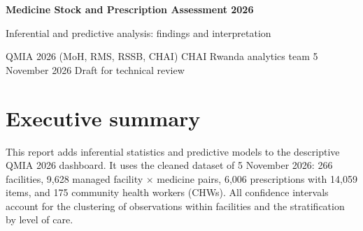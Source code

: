 \documentclass[10pt,a4paper]{article}
\begin{document}
\begin{titlepage}\vspace*{3cm}
{\Huge\bfseries\color{navy} Medicine Stock and Prescription Assessment 2026\par}\vspace{8pt}
{\Large\color{navy} Inferential and predictive analysis: findings and interpretation\par}\vspace{14pt}
{\small\color{gray} QMIA 2026 (MoH, RMS, RSSB, CHAI) \textperiodcentered{} CHAI Rwanda analytics team \textperiodcentered{} 5 November 2026 \textperiodcentered{} Draft for technical review\par}
\end{titlepage}
\tableofcontents\newpage

\section{Executive summary}
This report adds inferential statistics and predictive models to the descriptive QMIA 2026 dashboard. It uses the cleaned dataset of 5 November 2026: 266 facilities, 9,628 managed facility $\times$ medicine pairs, 6,006 prescriptions with 14,059 items, and 175 community health workers (CHWs). All confidence intervals account for the clustering of observations within facilities and the stratification by level of care.
\end{document}
